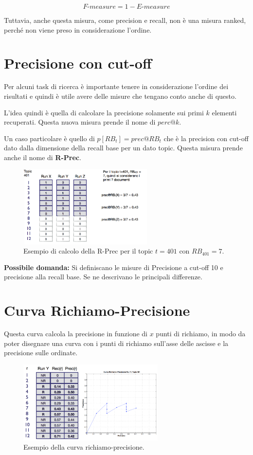 $$
F\text{-}measure = 1 - E\text{-}measure
$$

Tuttavia, anche questa misura, come precision e recall, non è una misura ranked, perché non viene preso in considerazione l'ordine.
\FloatBarrier
\section{Precisione con cut-off}

Per alcuni task di ricerca è importante tenere in considerazione l'ordine dei risultati e quindi è utile avere delle misure che tengano conto anche di questo.

L'idea quindi è quella di calcolare la precisione solamente sui primi $k$ elementi recuperati. Questa nuova misura prende il nome di $perc@k$.

Un caso particolare è quello di $p[RB_t] = prec@RB_t$ che è la precision con cut-off dato dalla dimensione della recall base per un dato topic. Questa misura prende anche il nome di \textbf{R-Prec}.

\begin{figure}[htbp]
	\centering
	\includegraphics[width=0.6\textwidth]{images/l15-fig-3-1.png}
	\caption{Esempio di calcolo della R-Prec per il topic $t = 401$ con $RB_{401} = 7$.}
\end{figure}

\textbf{{\color{Red} Possibile domanda:}} Si definiscano le misure di Precisione a cut-off 10 e precisione alla recall base. Se ne descrivano le principali differenze.

\FloatBarrier
\section{Curva Richiamo-Precisione}

Questa curva calcola la precisione in funzione di $x$ punti di richiamo, in modo da poter disegnare una curva con i punti di richiamo sull'asse delle ascisse e la precisione sulle ordinate.

\begin{figure}[htbp]
	\centering
	\includegraphics[width=0.65\textwidth]{images/l15-fig-4.png}
	\caption{Esempio della curva richiamo-precisione.}
\end{figure}

